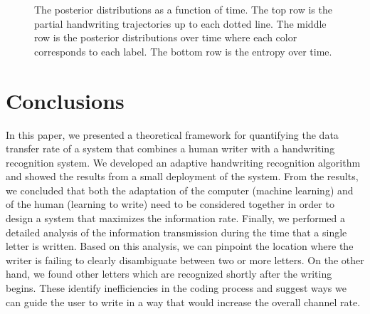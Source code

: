 \documentclass{sigchi}
\begin{document}
\begin{figure}
\begin{subfigure}[b]{0.25\textwidth}
    \caption{}
    \label{fig:entropy_y}
  \end{subfigure}
  \caption{The posterior distributions as a function of time. The top
    row is the partial handwriting trajectories up to each dotted
    line. The middle row is the posterior distributions over time
    where each color corresponds to each label. The bottom row is the
    entropy over time. }
  \label{fig:entropy}
\end{figure}


\section{Conclusions}
\label{sec:conclusions}

In this paper, we presented a theoretical framework for quantifying
the data transfer rate of a system that combines a human writer with a
handwriting recognition system. We developed an adaptive handwriting
recognition algorithm and showed the results from a small deployment
of the system. From the results, we concluded that both the adaptation
of the computer (machine learning) and of the human (learning to
write) need to be considered together in order to design a system that
maximizes the information rate. Finally, we performed a detailed
analysis of the information transmission during the time that a single
letter is written. Based on this analysis, we can pinpoint the
location where the writer is failing to clearly disambiguate between
two or more letters. On the other hand, we found other letters which
are recognized shortly after the writing begins. These identify
inefficiencies in the coding process and suggest ways we can guide the
user to write in a way that would increase the overall channel rate.


%
%
%
%
%



\end{document}
